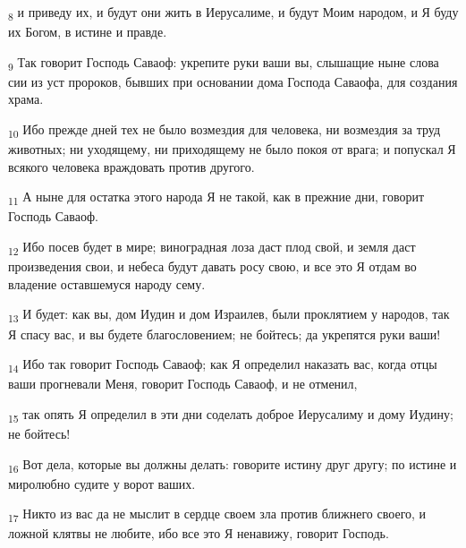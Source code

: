 \begin{tcolorbox}
\textsubscript{8} и приведу их, и будут они жить в Иерусалиме, и будут Моим народом, и Я буду их Богом, в истине и правде.
\end{tcolorbox}
\begin{tcolorbox}
\textsubscript{9} Так говорит Господь Саваоф: укрепите руки ваши вы, слышащие ныне слова сии из уст пророков, бывших при основании дома Господа Саваофа, для создания храма.
\end{tcolorbox}
\begin{tcolorbox}
\textsubscript{10} Ибо прежде дней тех не было возмездия для человека, ни возмездия за труд животных; ни уходящему, ни приходящему не было покоя от врага; и попускал Я всякого человека враждовать против другого.
\end{tcolorbox}
\begin{tcolorbox}
\textsubscript{11} А ныне для остатка этого народа Я не такой, как в прежние дни, говорит Господь Саваоф.
\end{tcolorbox}
\begin{tcolorbox}
\textsubscript{12} Ибо посев будет в мире; виноградная лоза даст плод свой, и земля даст произведения свои, и небеса будут давать росу свою, и все это Я отдам во владение оставшемуся народу сему.
\end{tcolorbox}
\begin{tcolorbox}
\textsubscript{13} И будет: как вы, дом Иудин и дом Израилев, были проклятием у народов, так Я спасу вас, и вы будете благословением; не бойтесь; да укрепятся руки ваши!
\end{tcolorbox}
\begin{tcolorbox}
\textsubscript{14} Ибо так говорит Господь Саваоф; как Я определил наказать вас, когда отцы ваши прогневали Меня, говорит Господь Саваоф, и не отменил,
\end{tcolorbox}
\begin{tcolorbox}
\textsubscript{15} так опять Я определил в эти дни соделать доброе Иерусалиму и дому Иудину; не бойтесь!
\end{tcolorbox}
\begin{tcolorbox}
\textsubscript{16} Вот дела, которые вы должны делать: говорите истину друг другу; по истине и миролюбно судите у ворот ваших.
\end{tcolorbox}
\begin{tcolorbox}
\textsubscript{17} Никто из вас да не мыслит в сердце своем зла против ближнего своего, и ложной клятвы не любите, ибо все это Я ненавижу, говорит Господь.
\end{tcolorbox}
